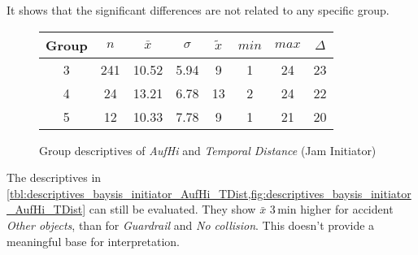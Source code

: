 It shows that the significant differences are not related to any specific group.
\begin{figure}[ht!]
	\centering
	\begin{minipage}{0.5\textwidth}
		\tiny
		\setlength{\tabcolsep}{4pt}
		\centering
		\begin{tabular}{c|c|c|c|c|c|c|c}
			\toprule
			Group & $n$ & $\bar{x}$ & $\sigma$ & $\tilde{x}$ & $min$ & $max$ & $\Delta$ \\
			\midrule
			3 & 241 & 10.52 & 5.94 & 9  & 1 & 24 & 23 \\
			4 & 24  & 13.21 & 6.78 & 13 & 2 & 24 & 22 \\
			5 & 12  & 10.33 & 7.78 & 9  & 1 & 21 & 20 \\
			\bottomrule
		\end{tabular}
		\label{tbl:descriptives_baysis_initiator_AufHi_TDist}
	\end{minipage}%
	\begin{minipage}{0.55\textwidth}
		\data 
        \pgfplotstablesort[sort key=mean, sort cmp=float >]{\datasorted}{\data}
        \tiny
        \centering
		\label{fig:descriptives_baysis_initiator_AufHi_TDist}
	\end{minipage}%
	\caption{Group descriptives of \textit{AufHi} and \textit{Temporal Distance} (Jam Initiator)}
\end{figure}
The descriptives in \cref{tbl:descriptives_baysis_initiator_AufHi_TDist,fig:descriptives_baysis_initiator_AufHi_TDist} can still be evaluated. They show $\bar{x}$ 3\,min higher for accident \textit{Other objects}, than for \textit{Guardrail} and \textit{No collision}. This doesn't provide a meaningful base for interpretation.


